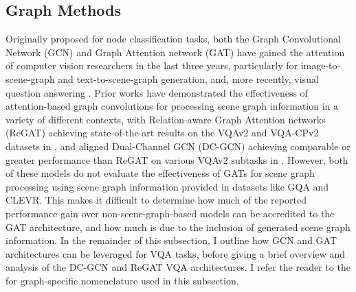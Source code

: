 



  




\subsection{Graph Methods}
\label{subsection:graph_methods_for_vqa}

Originally proposed for node classification tasks, both the Graph Convolutional Network (GCN) \cite{kipf2016semi} and Graph Attention network (GAT) \cite{velivckovic2017graph} have gained the attention of computer vision researchers in the last three years, particularly for image-to-scene-graph \cite{yang2018graph} and text-to-scene-graph \cite{han2020victr} generation, and, more recently, visual question answering \cite{li2019relation, huang2020aligned}.
Prior works have demonstrated the effectiveness of attention-based graph convolutions for processing scene graph information in a variety of different contexts, with Relation-aware Graph Attention networks (ReGAT) \cite{li2019relation} achieving state-of-the-art results on the VQAv2 and VQA-CPv2 datasets in \citeyear{li2019relation}, and aligned Dual-Channel GCN (DC-GCN) \cite{huang2020aligned} achieving comparable or greater performance than ReGAT on various VQAv2 subtasks in \citeyear{huang2020aligned}. However, both of these models do not evaluate the effectiveness of GATs for scene graph processing using scene graph information provided in datasets like GQA and CLEVR. This makes it difficult to determine how much of the reported performance gain over non-scene-graph-based models can be accredited to the GAT architecture, and how much is due to the inclusion of generated scene graph information. In the remainder of this subsection, I outline how GCN and GAT architectures can be leveraged for VQA tasks, before giving a brief overview and analysis of the DC-GCN and ReGAT VQA architectures. I refer the reader to the \nomref{} for graph-specific nomenclature used in this subsection.

